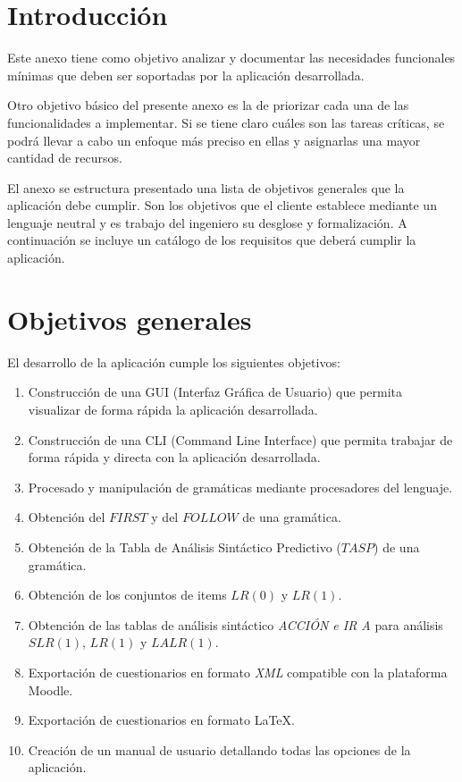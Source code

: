 
\section{Introducción}
Este anexo tiene como objetivo analizar y documentar las necesidades funcionales mínimas que deben ser soportadas por la aplicación desarrollada. 

Otro objetivo básico del presente anexo es la de priorizar cada una de las funcionalidades a implementar. Si se tiene claro cuáles son las tareas críticas, se podrá llevar a cabo un enfoque más preciso en ellas y asignarlas una mayor cantidad de recursos.

El anexo se estructura presentado una lista de objetivos generales que la aplicación debe cumplir. Son los objetivos que el cliente establece mediante un lenguaje neutral y es trabajo del ingeniero su desglose y formalización. A continuación se incluye un catálogo de los requisitos que deberá cumplir la aplicación.

\section{Objetivos generales}
El desarrollo de la aplicación cumple los siguientes objetivos:
\begin{enumerate}
	\item Construcción de una GUI (Interfaz Gráfica de Usuario) que permita visualizar de forma rápida la aplicación desarrollada.
	\item Construcción de una CLI (Command Line Interface) que permita trabajar de forma rápida y directa con la aplicación desarrollada.
	\item Procesado y manipulación de gramáticas mediante procesadores del lenguaje.
	\item Obtención del $FIRST$ y del $FOLLOW$ de una gramática.
	\item Obtención de la Tabla de Análisis Sintáctico Predictivo ($TASP$) de una gramática.
	\item Obtención de los conjuntos de items $LR(0)$ y  $LR(1)$.
	\item Obtención de las tablas de análisis sintáctico  \textit{ACCIÓN e IR A} para análisis $SLR(1)$, $LR(1)$ y $LALR(1)$.
	\item Exportación de cuestionarios en formato \textit{XML} compatible con la plataforma Moodle.
	
	\item Exportación de cuestionarios en formato \LaTeX{}.
	
	\item Creación de un manual de usuario detallando todas las opciones de la aplicación.
\end{enumerate}

